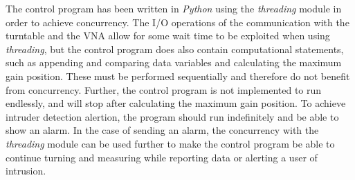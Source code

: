 The control program has been written in \textit{Python} using the \textit{threading} module in order to achieve concurrency. The I/O operations of the communication with the turntable and the VNA allow for some wait time to be exploited when using \textit{threading}, but the control program does also contain computational statements, such as appending and comparing data variables and calculating the maximum gain position. These must be performed sequentially and therefore do not benefit from concurrency. Further, the control program is not implemented to run endlessly, and will stop after calculating the maximum gain position. To achieve intruder detection alertion, the program should run indefinitely and be able to show an alarm. In the case of sending an alarm, the concurrency with the \textit{threading} module can be used further to make the control program be able to continue turning and measuring while reporting data or alerting a user of intrusion.


